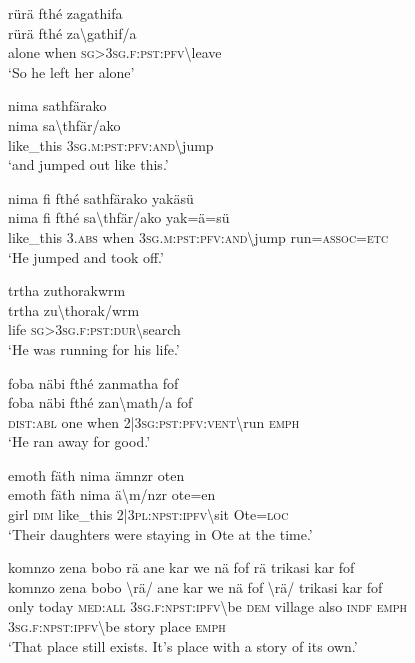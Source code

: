 \ea\label{ex:7:a4828}
rürä fthé zagathifa\\
\gll rürä	fthé	za{\textbackslash}gathif/a\\
     alone	when	\textsc{sg}>3\textsc{sg}.\textsc{f}:\textsc{pst}:\textsc{pfv}{\textbackslash}leave\\
\glt `So he left her alone'
\z

\ea\label{ex:7:a4829}
nima sathfärako\\
\gll nima	sa{\textbackslash}thfär/ako\\
     like\_this	3\textsc{sg}.\textsc{m}:\textsc{pst}:\textsc{pfv}:\textsc{and}{\textbackslash}jump\\
\glt `and jumped out like this.'
\z

\ea\label{ex:7:a4830}
nima fi fthé sathfärako yakäsü\\
\gll nima	fi	fthé	sa{\textbackslash}thfär/ako	yak=ä=sü\\
     like\_this	3.\textsc{abs}	when	3\textsc{sg}.\textsc{m}:\textsc{pst}:\textsc{pfv}:\textsc{and}{\textbackslash}jump	run=\textsc{assoc}=\textsc{etc}\\
\glt `He jumped and took off.'
\z

\ea\label{ex:7:a4831}
trtha zuthorakwrm\\
\gll trtha	zu{\textbackslash}thorak/wrm\\
     life	\textsc{sg}>3\textsc{sg}.\textsc{f}:\textsc{pst}:\textsc{dur}{\textbackslash}search\\
\glt `He was running for his life.'
\z

\ea\label{ex:7:a4832}
foba näbi fthé zanmatha fof\\
\gll foba	näbi	fthé	zan{\textbackslash}math/a	fof\\
     \textsc{dist}:\textsc{abl}	one	when	2|3\textsc{sg}:\textsc{pst}:\textsc{pfv}:\textsc{vent}{\textbackslash}run	\textsc{emph}\\
\glt `He ran away for good.'
\z

\ea\label{ex:7:a4833}
emoth fäth nima ämnzr oten\\
\gll emoth	fäth	nima	ä{\textbackslash}m/nzr	ote=en\\
     girl	\textsc{dim}	like\_this	2|3\textsc{pl}:\textsc{npst}:\textsc{ipfv}{\textbackslash}sit	Ote=\textsc{loc}\\
\glt `Their daughters were staying in Ote at the time.'
\z

\ea\label{ex:7:a4834}
komnzo zena bobo rä ane kar we nä fof rä trikasi kar fof\\
\gll komnzo	zena	bobo	{\textbackslash}rä/	ane	kar	we	nä	fof	{\textbackslash}rä/	trikasi	kar	fof\\
     only	today	\textsc{med}:\textsc{all}	3\textsc{sg}.\textsc{f}:\textsc{npst}:\textsc{ipfv}{\textbackslash}be	\textsc{dem}	village	also	\textsc{indf}	\textsc{emph}	3\textsc{sg}.\textsc{f}:\textsc{npst}:\textsc{ipfv}{\textbackslash}be	story	place	\textsc{emph}\\
\glt `That place still exists. It's place with a story of its own.'
\z

